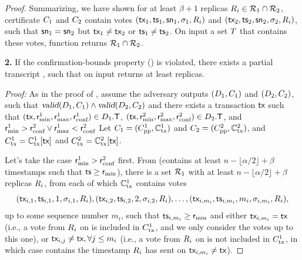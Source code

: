 \begin{proof}
	Summarizing, we have shown for at least $\beta + 1$ replicas $R_i \in \mathcal{R}_1 \cap \mathcal{R}_2$, certificate $C_1$ and $C_2$ contain votes $(\textsf{tx}_1, \textsf{ts}_1, \textsf{sn}_1, \sigma_1, R_i)$ and $(\textsf{tx}_2, \textsf{ts}_2, \textsf{sn}_2, \sigma_2, R_i)$, such that $\textsf{sn}_1 = \textsf{sn}_2$ but $\textsf{tx}_1 \neq \textsf{tx}_2$ or $\textsf{ts}_1 \neq \textsf{ts}_2$.
	On input a set $T$ that contains these votes, function \identify{\tran} returns $\mathcal{R}_1 \cap \mathcal{R}_2$.

	\textbf{2.}
	If the confirmation-bounds property () is violated, there exists a partial transcript \tran, such that  on input \tran returns at least \beta replicas.

	\noindent
	\emph{Proof:}
	As in the proof of , assume the adversary outputs $(D_1, C_1)$ and $(D_2, C_2)$, such that $\textsl{valid}(D_1, C_1) \land \textsl{valid}(D_2, C_2)$ and there exists a transaction $\textsf{tx}$ such that $(\textsf{tx}, \textsf{r}_\text{min}^1, \textsf{r}_\text{max}^1, \textsf{r}_\text{conf}^1) \in D_1.\textsf{T}$, $(\textsf{tx}, \textsf{r}_\text{min}^2, \textsf{r}_\text{max}^2, \textsf{r}_\text{conf}^2) \in D_2.\textsf{T}$, and $\textsf{r}_\text{min}^1 > \textsf{r}_\text{conf}^2 \lor \textsf{r}_\text{max}^1 < \textsf{r}_\text{conf}^2$
	Let $C_1 = (C_\text{pp}^1, \mathbb{C}_\text{tx}^1)$ and $C_2 = (C_\text{pp}^2, \mathbb{C}_\text{tx}^2)$, and $C_\text{tx}^1 = \mathbb{C}_\text{tx}^1[\textsf{tx}]$ and $C_\text{tx}^2 = \mathbb{C}_\text{tx}^2[\textsf{tx}]$.

	Let's take the case $\textsf{r}_\text{min}^1 > \textsf{r}_\text{conf}^2$ first. From  (\txVotes contains at least $n - \lfloor \alpha / 2 \rfloor + \beta$ timestamps \tsp such that $\textsf{ts} \geq \textsf{r}_\text{min}$), there is a set $\mathcal{R}_1$ with at least $n - \lfloor \alpha / 2 \rfloor + \beta$ replicas $R_i$, from each of which $\mathbb{C}_\text{tx}^1$ contains votes
	\begin{equation}\label{eq:proof-bounds-set1}
		(\textsf{tx}_{i,1}, \textsf{ts}_{i,1}, 1, \sigma_{i,1}, R_i), (\textsf{tx}_{i,2}, \textsf{ts}_{i,2}, 2, \sigma_{i,2}, R_i),
		\ldots, (\textsf{tx}_{i,m_i}, \textsf{ts}_{i, m_i}, m_i, \sigma_{i, m_i}, R_i),
	\end{equation}
	up to some sequence number $m_i$, such that $\textsf{ts}_{i, m_i} \geq \textsf{r}_\text{min}$ and either $\textsf{tx}_{i,m_i} = \textsf{tx}$ (i.e., a vote from $R_i$ on \tx is included in $C_\text{tx}^1$, and we only consider the votes up to this one), or  $\textsf{tx}_{i, j} \neq \textsf{tx}, \forall j \leq m_i$ (i.e., a vote from $R_i$ on \tx is not included in $C_\text{tx}^1$, in which case \txVotesMin contains the timestamp $R_i$ has sent on $\textsf{tx}_{i,m_i} \neq \textsf{tx}$).


\end{proof}
